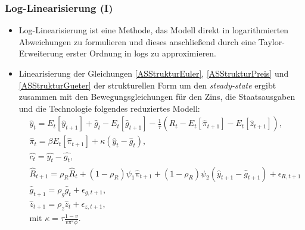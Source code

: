 \documentclass[10pt]{beamer}  %
\begin{document}
\begin{frame}\frametitle{Log-Linearisierung (I)}\label{Loglin}\small
\begin{itemize}
\item Log-Linearisierung ist eine Methode, das Modell direkt in logarithmierten Abweichungen zu formulieren und dieses anschlie{\ss}end
durch eine Taylor-Erweiterung erster Ordnung in logs zu approximieren.
\item Linearisierung der Gleichungen \eqref{ASStrukturEuler}, \eqref{ASStrukturPreis} und \eqref{ASStrukturGueter} der strukturellen Form
um den \emph{steady-state} \hyperlink{app:Loglin}{} ergibt zusammen mit den Bewegungsgleichungen f\"{u}r den Zins, die
Staatsausgaben und die Technologie folgendes reduziertes Modell:
\begin{eqnarray*}
  &\widehat{y}_t = E_t[\widehat{y}_{t+1}] + \widehat{g}_t - E_t[\widehat{g}_{t+1}] - \frac{1}{\tau} (\widehat{R}_t - E_t[\widehat{\pi}_{t+1}] - E_t[\widehat{z}_{t+1}]),\\
  &\widehat{\pi}_t = \beta E_t[\widehat{\pi}_{t+1}]+\kappa(\widehat{y}_t-\widehat{g}_t),\\
  &\widehat{c_t} = \widehat{y_t }- \widehat{g_t},\\
&  \widehat{R}_{t+1} = \rho_R \widehat{R}_{t} + (1-\rho_R)\psi_1 \widehat{\pi}_{t+1} + (1-\rho_R)\psi_2 \left(\widehat{y}_{t+1}-\widehat{g}_{t+1}\right) + \epsilon_{R,t+1}\\
& \widehat{g}_{t+1} = \rho_g \widehat{g}_{t} + \epsilon_{g,{t+1}},\\
& \widehat{z}_{t+1} = \rho_z \widehat{z}_{t} + \epsilon_{z,{t+1}},\\
&\text{mit~}\kappa = \tau \frac{1-v}{v \pi^2 \phi}.
\end{eqnarray*}
\end{itemize}
\end{frame}
\end{document}

